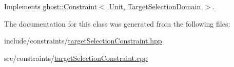 Implements \hyperlink{classghost_1_1Constraint_a8dd05c04dbce51e88a6301e9332fb2f5}{ghost\-::\-Constraint$<$ Unit, Target\-Selection\-Domain $>$}.



The documentation for this class was generated from the following files\-:\begin{DoxyCompactItemize}
\item 
include/constraints/\hyperlink{targetSelectionConstraint_8hpp}{target\-Selection\-Constraint.\-hpp}\item 
src/constraints/\hyperlink{targetSelectionConstraint_8cpp}{target\-Selection\-Constraint.\-cpp}\end{DoxyCompactItemize}
